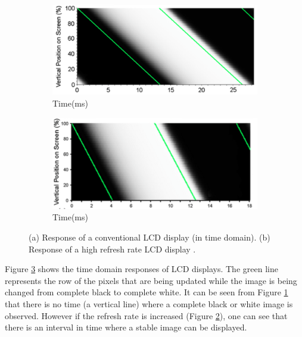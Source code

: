 \begin{figure}[htbp]
\centering
     \begin{subfigure}[b]{0.4\textwidth}
        \includegraphics[width=\textwidth]{./Template_Figures/LCD_refresh_low}
        \caption{ Time(ms)}\label{fig:response_low}
    \end{subfigure}
    \begin{subfigure}[b]{0.4\textwidth}
        \includegraphics[width=\textwidth]{./Template_Figures/LCD_refresh_high}
        \caption{ Time(ms)}\label{fig:response_high}
    \end{subfigure}

    \caption{(a) Response of a conventional LCD display (in time domain). (b) Response of a high refresh rate LCD display \cite{woods2012crosstalk}.  \label{fig:LCD_refresh}}
\end{figure}

Figure \ref{fig:LCD_refresh} shows the time domain responses of LCD displays. The green line represents the row of the pixels that are being updated while the image is being changed from complete black to complete white. It can be seen from Figure \ref{fig:response_low} that there is no time (a vertical line) where a complete black or white image is observed. However if the refresh rate is increased (Figure \ref{fig:response_high}), one can see that there is an interval in time where a stable image can be displayed.

